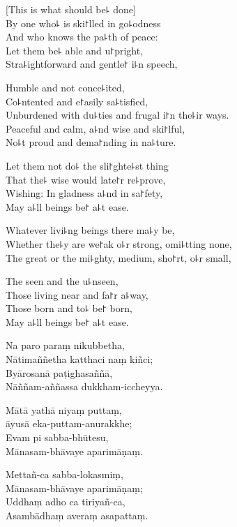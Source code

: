 \begin{leader}
\end{leader}

[This is what should be꜕ done]\\
By one who꜕ is ski꜓lled in go꜕odness\\
And who knows the pa꜕th of peace:\\
Let them be꜕ able and u꜓pright,\\
Stra꜕ightforward and gentle꜓ i꜕n speech,

Humble and not conce꜕ited,\\
Co꜕ntented and e꜓asily sa꜕tisfied,\\
Unburdened with du꜕ties and frugal i꜓n the꜕ir ways.\\
Peaceful and calm, a꜕nd wise and ski꜓lful,\\
No꜕t proud and dema꜓nding in na꜕ture.

Let them not do꜕ the sli꜓ghte꜕st thing\\
That the꜕ wise would late꜓r re꜕prove,\\
Wishing: In gladness a꜕nd in sa꜓fety,\\
May a꜕ll beings be꜓ a꜕t ease.

Whatever livi꜕ng beings there ma꜕y be,\\
Whether the꜕y are we꜓ak o꜕r strong, omi꜕tting none,\\
The great or the mi꜕ghty, medium, sho꜓rt, o꜕r small,

The seen and the u꜕nseen,\\
Those living near and fa꜓r a꜕way,\\
Those born and to꜕ be꜓ born,\\
May a꜕ll beings be꜓ a꜕t ease.

\clearpage

Na paro paraṃ nikubbetha,\\%
Nātimaññetha katthaci naṃ kiñci;\\
Byārosanā paṭighasaññā,\\
Nāññam-aññassa dukkham-iccheyya.

Mātā yathā niyaṃ puttaṃ,\\
āyusā eka-puttam-anurakkhe;\\
Evam pi sabba-bhūtesu,\\
Mānasam-bhāvaye aparimāṇaṃ.

Mettañ-ca sabba-lokasmiṃ,\\
Mānasam-bhāvaye aparimāṇaṃ;\\
Uddhaṃ adho ca tiriyañ-ca,\\
Asambādhaṃ averaṃ asapattaṃ.

